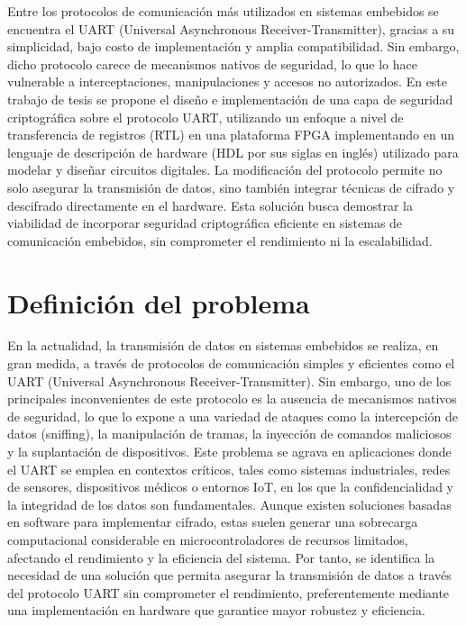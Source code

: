Entre los protocolos de comunicación más utilizados en sistemas embebidos se encuentra el UART (Universal Asynchronous Receiver-Transmitter), gracias a su simplicidad, bajo costo de implementación y amplia compatibilidad. Sin embargo, dicho protocolo carece de mecanismos nativos de seguridad, lo que lo hace vulnerable a interceptaciones, manipulaciones y accesos no autorizados.
En este trabajo de tesis se propone el diseño e implementación de una capa de seguridad criptográfica sobre el protocolo UART, utilizando un enfoque a nivel de transferencia de registros (RTL) en una plataforma FPGA implementando en un lenguaje de descripción de hardware (HDL  por sus siglas en inglés) utilizado para modelar y diseñar circuitos digitales. La modificación del protocolo permite no solo asegurar la transmisión de datos, sino también integrar técnicas de cifrado y descifrado directamente en el hardware. Esta solución busca demostrar la viabilidad de incorporar seguridad criptográfica eficiente en sistemas de comunicación embebidos, sin comprometer el rendimiento ni la escalabilidad.
\\
\section{Definición del problema}
En la actualidad, la transmisión de datos en sistemas embebidos se realiza, en gran medida, a través de protocolos de comunicación simples y eficientes como el UART (Universal Asynchronous Receiver-Transmitter). Sin embargo, uno de los principales inconvenientes de este protocolo es la ausencia de mecanismos nativos de seguridad, lo que lo expone a una variedad de ataques como la intercepción de datos (sniffing), la manipulación de tramas, la inyección de comandos maliciosos y la suplantación de dispositivos.
Este problema se agrava en aplicaciones donde el UART se emplea en contextos críticos, tales como sistemas industriales, redes de sensores, dispositivos médicos o entornos IoT, en los que la confidencialidad y la integridad de los datos son fundamentales. Aunque existen soluciones basadas en software para implementar cifrado, estas suelen generar una sobrecarga computacional considerable en microcontroladores de recursos limitados, afectando el rendimiento y la eficiencia del sistema.
Por tanto, se identifica la necesidad de una solución que permita asegurar la transmisión de datos a través del protocolo UART sin comprometer el rendimiento, preferentemente mediante una implementación en hardware que garantice mayor robustez y eficiencia.
\newpage
